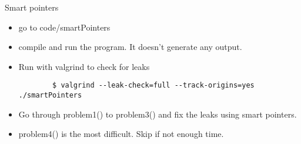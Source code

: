 \begin{frame}[fragile]
  \begin{exercise}{Smart pointers}
    \begin{itemize}
    \item go to code/smartPointers
    \item compile and run the program. It doesn't generate any output.
    \item Run with valgrind to check for leaks
      { \scriptsize
      \begin{verbatim}
        $ valgrind --leak-check=full --track-origins=yes ./smartPointers
      \end{verbatim}
      }
    \item Go through {\ttfamily problem1()} to {\ttfamily problem3()} and fix the leaks using smart pointers.
    \item {\ttfamily problem4()} is the most difficult. Skip if not enough time.
    \end{itemize}
  \end{exercise}
\end{frame}
